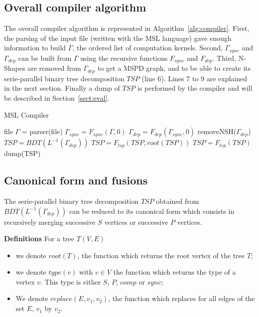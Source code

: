 \subsection{Overall compiler algorithm}

The overall compiler algorithm is represented in Algorithm~\ref{alg:compiler}. First, the parsing of the input file (written with the MSL language) gave enough information to build $\Gamma$, the ordered list of computation kernels. Second, $\Gamma_{sync}$ and $\Gamma_{dep}$ can be built from $\Gamma$ using the recursive functions $F_{sync}$ and $F_{dep}$. Third, N-Shapes are removed from $\Gamma_{dep}$ to get a MSPD graph, and to be able to create its serie-parallel binary tree decomposition $TSP$ (line 6). Lines 7 to 9 are explained in the next section. Finally a dump of $TSP$ is performed by the compiler and will be described in Section~\ref{sect:eval}.

\begin{algorithm}
\caption{MSL Compiler}
\label{alg:compiler}
\begin{algorithmic}[1]
 {file}
\State $\Gamma$ = parser(file)
\State $\Gamma_{sync} = F_{sync}(\Gamma,0)$
\State $\Gamma_{dep} = F_{dep}(\Gamma_{sync},0)$
\State removeNSH($\Gamma_{dep}$)
\State $TSP = BDT(L^{-1}(\Gamma_{dep}))$
\State $TSP = F_{tsp}(TSP,root(TSP))$
\State $TSP = F_{tsp}(TSP)$
\EndIf
\State dump(TSP)
\EndProcedure
\end{algorithmic}
\end{algorithm}

\subsection{Canonical form and fusions}

The serie-parallel binary tree decomposition $TSP$ obtained from $BDT(L^{-1}(\Gamma_{dep}))$ can be reduced to its canonical form which consists in recursively merging successive $S$ vertices or successive $P$ vertices.

\medskip
\noindent \textbf{Definitions} For a tree $T(V,E)$
\begin{itemize}
\item we denote $root(T)$, the function which returns the root vertex of the tree $T$;
\item we denote $type(v)$ with $v \in V$ the function which returns the type of a vertex $v$. This type is either $S$, $P$, $comp$ or $sync$;
\item We denote $replace(E,v_1,v_2)$, the function which replaces for all edges of the set $E$, $v_1$ by $v_2$.
\end{itemize}

